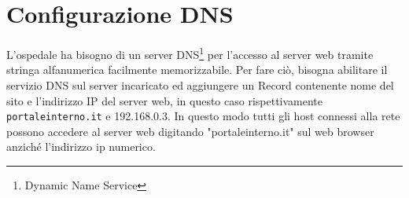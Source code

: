 \section{Configurazione DNS}
\hspace{24pt}L'ospedale ha bisogno di un server DNS\footnote{Dynamic Name Service} per l'accesso al server web tramite stringa 
alfanumerica facilmente memorizzabile. Per fare ciò, bisogna abilitare il servizio DNS sul server incaricato ed 
aggiungere un Record contenente nome del sito e l'indirizzo IP del server web, in questo caso rispettivamente 
\texttt{portaleinterno.it} e 192.168.0.3. In questo modo tutti gli host connessi alla rete possono accedere 
al server web digitando "portaleinterno.it" sul web browser anziché l'indirizzo ip numerico.